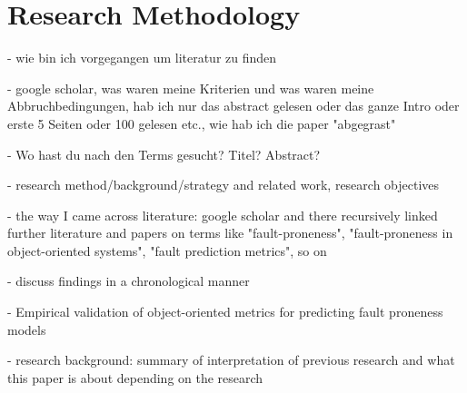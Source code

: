 \section{Research Methodology}\label{research}

- wie bin ich vorgegangen um literatur zu finden

- google scholar, was waren meine Kriterien und was waren meine Abbruchbedingungen, hab ich nur das abstract gelesen oder das ganze Intro oder erste 5 Seiten oder 100 gelesen etc., wie hab ich die paper "abgegrast"

- Wo hast du nach den Terms gesucht? Titel? Abstract?

- research method/background/strategy and related work, research objectives 

- the way I came across literature: google scholar and there recursively linked further literature and papers on terms like "fault-proneness", "fault-proneness in object-oriented systems", "fault prediction metrics", so on

- discuss findings in a chronological manner

- \cite{b13singh2010empirical} Empirical validation of object-oriented metrics for predicting fault proneness models

- research background: summary of interpretation of previous research and what this paper is about depending on the research